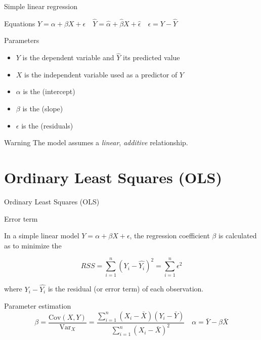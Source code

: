 \documentclass[t]{beamer}
\begin{document}
	\begin{frame}{Simple linear regression}
		 
		\begin{block}{Equations}
			$Y = \alpha + \beta X + \epsilon \quad \hat{Y} = \hat{\alpha} + \hat{\beta} X + \hat{\epsilon} \quad \epsilon = Y - \hat{Y}$
		\end{block}
		
		\begin{block}{Parameters}
			\begin{itemize}
			 	\item $Y$ is the dependent variable and $\hat{Y}$ its predicted value
			 	\item $X$ is the independent variable used as a predictor of $Y$
			 	\item $\alpha$ is the  (intercept)
			 	\item $\beta$ is the  (slope)
			 	\item $\epsilon$ is the  (residuals)
			\end{itemize}
		\end{block}

		\begin{alertblock}{Warning}
		 	The model assumes a \emph{linear}, \emph{additive} relationship.
		\end{alertblock}
		
	\end{frame}

	
	\section{Ordinary Least Squares (OLS)}

	\begin{frame}[c]{Ordinary Least Squares (OLS)}
		
		\begin{block}{Error term}

		In a simple linear model $Y = \alpha + \beta X + \epsilon$, the regression coefficient $\beta$ is calculated as to minimize the 

		$$RSS = \sum _{i=1} ^n (Y_i - \hat{Y_i})^2 = \sum _{i=1} ^n \epsilon^2$$

		where $Y_i - \hat{Y_i}$ is the residual (or error term) of each observation.
		\end{block}
		
		\begin{block}{Parameter estimation}
			$$\beta = \frac{\text{Cov}(X,Y)}{\text{Var}_X} = \frac{\sum ^n _{i=1}(X_i - \bar{X}) (Y_i - \bar{Y})}{\sum ^n _{i=1}(X_i - \bar{X})^2} \quad \alpha = \bar{Y} - \beta\bar{X}$$
		\end{block}
				
	\end{frame}
\end{document}
